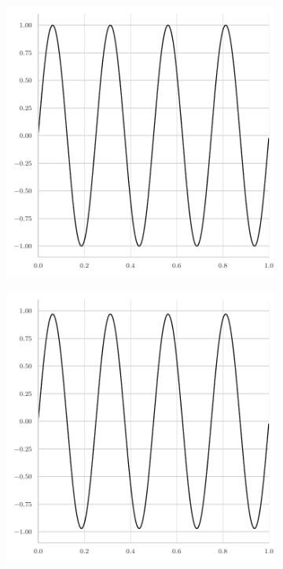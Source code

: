 \begin{figure}
	\centering
	\begin{subfigure}[b]{0.45\textwidth}
		\centering
		\includegraphics[width=\textwidth]{figures/initial_error_jacobi_8pi.pdf}
	\end{subfigure}
	\hfill
	\begin{subfigure}[b]{0.45\textwidth}
		\centering
		\includegraphics[width=\textwidth]{figures/final_error_jacobi_8pi.pdf}

\end{subfigure}
\end{figure}
